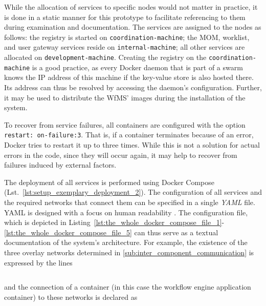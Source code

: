   While the allocation of services to specific nodes would not matter in practice, it is done in a static manner for this prototype to facilitate referencing to them during examination and documentation.
  The services are assigned to the nodes as follows: the registry is started on \texttt{coordination-machine}; the \ac{MOM}, worklist, and user gateway services reside on \texttt{internal-machine}; all other services are allocated on \texttt{development-machine}. Creating the registry on the \texttt{coordination-machine} is a good practice, as every Docker daemon that is part of a swarm knows the \ac{IP} address of this machine if the key-value store is also hosted there. Its address can thus be resolved by accessing the daemon's configuration. Further, it may be used to distribute the \ac{WfMS}' images during the installation of the system.

  To recover from service failures, all containers are configured with the option \texttt{restart: on-failure:3}. That is, if a container terminates because of an error, Docker tries to restart it up to three times. While this is not a solution for actual errors in the code, since they will occur again, it may help to recover from failures induced by external factors.

  The deployment of all services is performed using Docker Compose (Lst.~\ref{lst:setup_exemplary_deployment_2}).
  The configuration of all services and the required networks that connect them can be specified in a single \emph{YAML} file. \ac{YAML} is designed with a focus on human readability \cite{Kiki2009Yaml}.
  The configuration file, which is depicted in Listing~\ref{lst:the_whole_docker_compose_file_1}-\ref{lst:the_whole_docker_compose_file_5} can thus serve as a textual documentation of the system's architecture.
  For example, the existence of the three overlay networks determined in \ref{sub:inter_component_communication} is expressed by the lines

  \inputminted[firstline=3,lastline=9,fontsize=\footnotesize,linenos=true,numberblanklines=true,showspaces=false,breaklines=true,baselinestretch=1]{yaml}{../code/wfms.yml}

  and the connection of a container (in this case the workflow engine application container) to these networks is declared as

  \inputminted[firstline=34,lastline=34,fontsize=\footnotesize,linenos=true,numberblanklines=true,showspaces=false,breaklines=true,baselinestretch=1]{yaml}{../code/wfms.yml}
  \inputminted[firstline=43,lastline=45,fontsize=\footnotesize,linenos=true,numberblanklines=true,showspaces=false,breaklines=true,baselinestretch=1]{yaml}{../code/wfms.yml}

